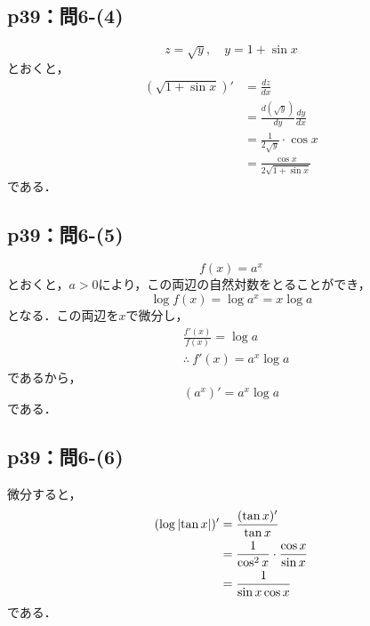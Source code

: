 \documentclass[uplatex,dvipdfmx,a4paper,10pt,fleqn]{jsarticle}
\newenvironment{tleftbar}{\begin{tbleftline}\setlength{\parindent}{1zw}}{\end{tbleftline}}
\begin{document}
\subsection*{p39：問6-(4)}


\begin{tleftbar}
    \[
        z = \sqrt{y} , \quad y = 1+\sin x 
    \]
    とおくと，
    \begin{align*} 
        (\sqrt{1+\sin x}) '  &= \frac{dz}{dx} \\
        & = \frac{d (\sqrt{y})}{dy} \frac{dy}{dx}\\
        &= \frac{1}{2\sqrt{y}}\cdot \cos x  \\
        & = \frac{\cos x}{2\sqrt{1+\sin x}}
    \end{align*}
    である．
\end{tleftbar}

\subsection*{p39：問6-(5)}


\begin{tleftbar}
    \[
        f(x)=a^x
    \]
    とおくと，$a>0$により，この両辺の自然対数をとることができ，
    \[
        \log f(x) = \log a^x = x\log a 
    \]
    となる．この両辺を$x$で微分し，
    \begin{align*} 
        & \frac{f'(x)}{f(x)} = \log a \\
        & \therefore ~ f'(x)= a^x \log a 
    \end{align*} 
    であるから，
    \[
        (a^x)' = a^x \log a
    \]
    である．
\end{tleftbar}

\subsection*{p39：問6-(6)}

\begin{tleftbar}
    微分すると，
    \begin{align*} 
        (\log \abs{\tan x} )' & = \frac{(\tan x)'}{\tan x} \\
        & = \frac{1}{\cos ^2 x} \cdot \frac{ \cos x}{\sin x} \\
        & = \frac{1}{\sin x \cos x}
    \end{align*} 
    である．
    \end{tleftbar}
\end{document}
